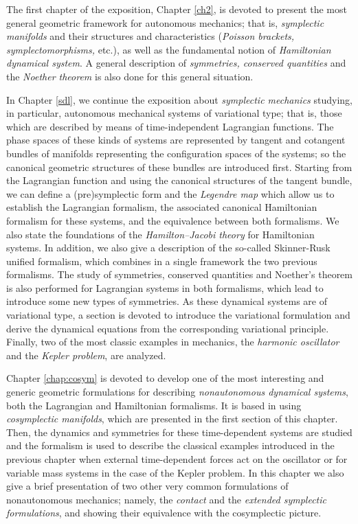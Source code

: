 \documentclass[12pt]{report}
\begin{document}
The first chapter of the exposition, Chapter \ref{ch2}, is devoted
to present the most general geometric framework for autonomous mechanics;
that is, {\sl symplectic manifolds} and their structures and characteristics
({\sl Poisson brackets, symplectomorphisms,} etc.),
as well as the fundamental notion of {\sl Hamiltonian dynamical system}.
A general description of {\sl symmetries, conserved quantities} and the 
{\sl Noether theorem} is also done for this general situation.

In Chapter \ref{sdl}, we continue the exposition about {\sl symplectic mechanics}
studying, in particular, autonomous mechanical systems of variational type;
that is, those which are described by means of time-independent Lagrangian functions.
The phase spaces of these kinds of systems are represented by tangent
and cotangent bundles of manifolds representing 
the configuration spaces of the systems; so the canonical geometric structures
of these bundles are introduced first.
Starting from the Lagrangian function and using the canonical structures of the tangent bundle,
we can define a (pre)symplectic form and the {\sl Legendre map}
which allow us to establish the Lagrangian formalism,
the associated canonical Hamiltonian formalism for these systems,
and the equivalence between both formalisms.
We also state the foundations of the {\sl Hamilton--Jacobi theory}
for Hamiltonian systems.
In addition, we also give a description of the so-called {Skinner-Rusk unified formalism}, 
which combines in a single framework the two previous formalisms.
The study of symmetries, conserved quantities and Noether's theorem is
also performed for Lagrangian systems in both formalisms,
which lead to introduce some new types of symmetries.
As these dynamical systems are of variational type,
a section is devoted to introduce the variational formulation
and derive the dynamical equations from the corresponding variational principle.
Finally, two of the most classic examples in mechanics,
the {\sl harmonic oscillator\/} and the {\sl Kepler problem},
are analyzed.

Chapter \ref{chap:cosym} is devoted to develop one of the most interesting
and generic geometric formulations for describing 
{\sl nonautonomous dynamical systems}, 
both the Lagrangian and Hamiltonian formalisms.
It is based in using {\sl cosymplectic manifolds},
which are presented in the first section of this chapter.
Then, the dynamics and symmetries for these time-dependent systems are studied
and the formalism is used to describe the classical examples introduced in the previous chapter
when external time-dependent forces act on the oscillator
or for variable mass systems in the case of the Kepler problem.
In this chapter we also give a brief presentation
of two other very common formulations of nonautonomous mechanics;
namely, the {\sl contact} and the {\sl extended symplectic formulations}, 
and showing their equivalence with the cosymplectic picture.
\end{document}
